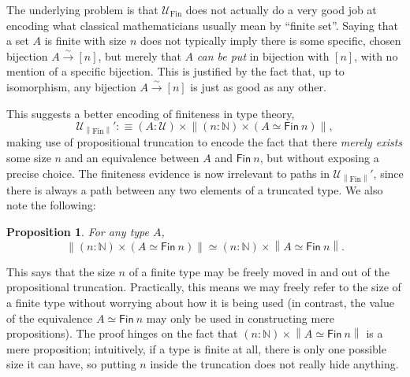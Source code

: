 \documentclass[preprint,authoryear]{sigplanconf}
\newcommand{\bbb}[1]{\ensuremath{\mathbb{#1}}\xspace}
\providecommand{\N}{\bbb{N}}
\newcommand{\bij}{\stackrel{\sim}{\longrightarrow}}
\let\oldequiv\equiv
\newcommand{\jeq}{\oldequiv}          %
\newcommand{\defeq}{\mathrel{:\jeq}}  %
\renewcommand{\equiv}{\simeq}         %
\newtheorem{prop}[thm]{Proposition}
\theoremstyle{definition}
\theoremstyle{remark}
\newcommand{\cons}[1]{\ensuremath{\mathsf{#1}}}
\newcommand{\Type}{\ensuremath{\mathcal{U}}}
\newcommand{\FinType}{\ensuremath{\Type_{\text{Fin}}}}
\newcommand{\FinTypeT}{\ensuremath{\Type_{\ptrunc{\text{Fin}}}}}
\newcommand{\Fin}[1]{\ensuremath{\cons{Fin}\ #1}}
\newcommand{\ptrunc}[1]{\ensuremath{\left\|#1\right\|}}
\newcommand{\fin}[1]{\ensuremath{[#1]}}
\begin{document}
The underlying problem is that $\FinType$ does not actually do a very
good job at encoding what classical mathematicians usually mean by
``finite set''.  Saying that a set $A$ is finite with size $n$ does
not typically imply there is some specific, chosen bijection $A \bij
\fin n$, but merely that $A$ \emph{can be put} in bijection with $\fin
n$, with no mention of a specific bijection.  This is justified by the
fact that, up to isomorphism, any bijection $A \bij \fin n$ is just as
good as any other.

This suggests a better encoding of finiteness in type theory, \[
\FinTypeT' \defeq (A : \Type) \times \ptrunc{(n : \N) \times (A \equiv
  \Fin n)}, \] making use of propositional truncation to encode the
fact that there \emph{merely exists} some size $n$ and an equivalence
between $A$ and $\Fin n$, but without exposing a precise choice.  The
finiteness evidence is now irrelevant to paths in $\FinTypeT'$, since
there is always a path between any two elements of a truncated type.
We also note the following:
\begin{prop}
  For any type $A$, \[ \ptrunc{(n : \N) \times (A \equiv \Fin n)} \equiv
  (n : \N) \times \ptrunc{A \equiv \Fin n}. \]
\end{prop}
This says that the size $n$ of a finite type may be freely moved in
and out of the propositional truncation.  Practically, this means we
may freely refer to the size of a finite type without worrying about
how it is being used (in contrast, the value of the equivalence $A
\equiv \Fin n$ may only be used in constructing mere propositions).
The proof hinges on the fact that $(n : \N) \times \ptrunc{A \equiv \Fin
  n}$ is a mere proposition; intuitively, if a type is finite at all,
there is only one possible size it can have, so putting $n$ inside the
truncation does not really hide anything.
\end{document}
